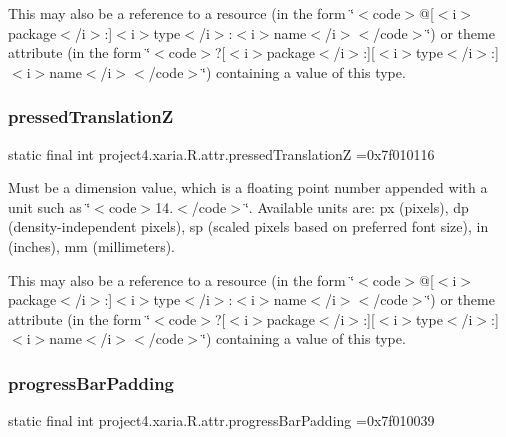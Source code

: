 This may also be a reference to a resource (in the form \char`\"{}$<$code$>$@\mbox{[}$<$i$>$package$<$/i$>$\+:\mbox{]}$<$i$>$type$<$/i$>$\+:$<$i$>$name$<$/i$>$$<$/code$>$\char`\"{}) or theme attribute (in the form \char`\"{}$<$code$>$?\mbox{[}$<$i$>$package$<$/i$>$\+:\mbox{]}\mbox{[}$<$i$>$type$<$/i$>$\+:\mbox{]}$<$i$>$name$<$/i$>$$<$/code$>$\char`\"{}) containing a value of this type. \mbox{\label{classproject4_1_1xaria_1_1R_1_1attr_a572181f7a9e6b352ad203e9196c6a291}} 
\subsubsection{\texorpdfstring{pressed\+TranslationZ}{pressedTranslationZ}}
{\footnotesize\ttfamily static final int project4.\+xaria.\+R.\+attr.\+pressed\+TranslationZ =0x7f010116\hspace{0.3cm}{\ttfamily [static]}}

Must be a dimension value, which is a floating point number appended with a unit such as \char`\"{}$<$code$>$14.\+5sp$<$/code$>$\char`\"{}. Available units are\+: px (pixels), dp (density-\/independent pixels), sp (scaled pixels based on preferred font size), in (inches), mm (millimeters). 

This may also be a reference to a resource (in the form \char`\"{}$<$code$>$@\mbox{[}$<$i$>$package$<$/i$>$\+:\mbox{]}$<$i$>$type$<$/i$>$\+:$<$i$>$name$<$/i$>$$<$/code$>$\char`\"{}) or theme attribute (in the form \char`\"{}$<$code$>$?\mbox{[}$<$i$>$package$<$/i$>$\+:\mbox{]}\mbox{[}$<$i$>$type$<$/i$>$\+:\mbox{]}$<$i$>$name$<$/i$>$$<$/code$>$\char`\"{}) containing a value of this type. \mbox{\label{classproject4_1_1xaria_1_1R_1_1attr_a371d550d06ea30a134c7549ea10a1718}} 
\subsubsection{\texorpdfstring{progress\+Bar\+Padding}{progressBarPadding}}
{\footnotesize\ttfamily static final int project4.\+xaria.\+R.\+attr.\+progress\+Bar\+Padding =0x7f010039\hspace{0.3cm}{\ttfamily [static]}}

